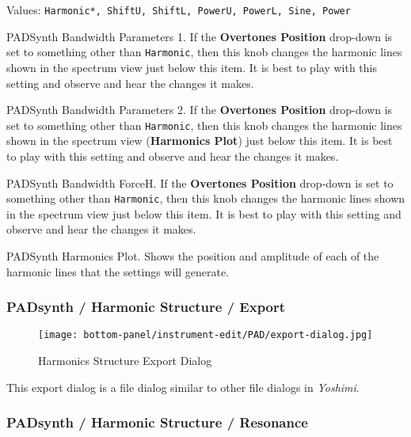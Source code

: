   Values: \texttt{Harmonic*, ShiftU, ShiftL, PowerU, PowerL, Sine, Power}

   PADSynth Bandwidth Parameters 1.
   If the \textbf{Overtones Position} drop-down is set to something other than
   \texttt{Harmonic}, then this knob changes the harmonic lines shown in the
   spectrum view just below this item.
   It is best to play with this setting and observe and hear the changes it
   makes.

   PADSynth Bandwidth Parameters 2.
   If the \textbf{Overtones Position} drop-down is set to something other than
   \texttt{Harmonic}, then this knob changes the harmonic lines shown in the
   spectrum view (\textbf{Harmonics Plot}) just below this item.
   It is best to play with this setting and observe and hear the changes it
   makes.

   PADSynth Bandwidth ForceH.
   If the \textbf{Overtones Position} drop-down is set to something other than
   \texttt{Harmonic}, then this knob changes the harmonic lines shown in the
   spectrum view just below this item.
   It is best to play with this setting and observe and hear the changes it
   makes.

   PADSynth Harmonics Plot.
   Shows the position and amplitude of each of the harmonic lines that the
   settings will generate.

\subsubsection{PADsynth / Harmonic Structure / Export}
\label{subsubsec:padsynth_harmonic_structure_export}

\begin{figure}[H]
   \centering
   \texttt{[image: bottom-panel/instrument-edit/PAD/export-dialog.jpg]}
   \caption{Harmonics Structure Export Dialog}
   \label{fig:harmonics_structure_export_dialog}
\end{figure}

   This export dialog is a file dialog similar to other file dialogs
   in \textsl{Yoshimi}.

\subsubsection{PADsynth / Harmonic Structure / Resonance}
\label{subsubsec:padsynth_harmonic_structure_resonance}

